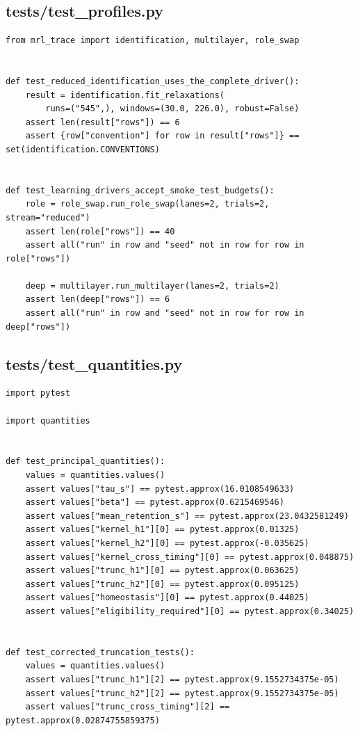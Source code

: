 \documentclass[a4paper,10pt]{article}
\begin{document}
\subsection{tests/test\_profiles.py}
\begin{Verbatim}
from mrl_trace import identification, multilayer, role_swap


def test_reduced_identification_uses_the_complete_driver():
    result = identification.fit_relaxations(
        runs=("545",), windows=(30.0, 226.0), robust=False)
    assert len(result["rows"]) == 6
    assert {row["convention"] for row in result["rows"]} == set(identification.CONVENTIONS)


def test_learning_drivers_accept_smoke_test_budgets():
    role = role_swap.run_role_swap(lanes=2, trials=2, stream="reduced")
    assert len(role["rows"]) == 40
    assert all("run" in row and "seed" not in row for row in role["rows"])

    deep = multilayer.run_multilayer(lanes=2, trials=2)
    assert len(deep["rows"]) == 6
    assert all("run" in row and "seed" not in row for row in deep["rows"])
\end{Verbatim}
\subsection{tests/test\_quantities.py}
\begin{Verbatim}
import pytest

import quantities


def test_principal_quantities():
    values = quantities.values()
    assert values["tau_s"] == pytest.approx(16.0108549633)
    assert values["beta"] == pytest.approx(0.6215469546)
    assert values["mean_retention_s"] == pytest.approx(23.0432581249)
    assert values["kernel_h1"][0] == pytest.approx(0.01325)
    assert values["kernel_h2"][0] == pytest.approx(-0.035625)
    assert values["kernel_cross_timing"][0] == pytest.approx(0.048875)
    assert values["trunc_h1"][0] == pytest.approx(0.063625)
    assert values["trunc_h2"][0] == pytest.approx(0.095125)
    assert values["homeostasis"][0] == pytest.approx(0.44025)
    assert values["eligibility_required"][0] == pytest.approx(0.34025)


def test_corrected_truncation_tests():
    values = quantities.values()
    assert values["trunc_h1"][2] == pytest.approx(9.1552734375e-05)
    assert values["trunc_h2"][2] == pytest.approx(9.1552734375e-05)
    assert values["trunc_cross_timing"][2] == pytest.approx(0.02874755859375)
\end{Verbatim}
\end{document}
